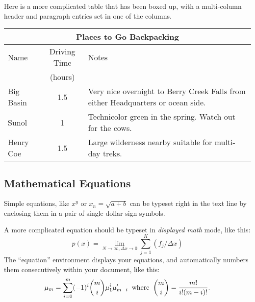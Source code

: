 \documentclass[11pt,oneside]{book}
\begin{document}
Here is a more complicated table that has been boxed up, with a multi-column
header and paragraph entries set in one of the columns.
\begin{center}
\begin{tabular}{|l|c|p{3.5in}|}
\hline
\multicolumn{3}{|c|}{Places to Go Backpacking}\\ \hline
Name&Driving Time&Notes\\
&(hours)&\\ \hline
Big Basin&1.5&Very nice overnight to Berry Creek Falls from
either Headquarters or ocean side.\\ \hline
Sunol&1&Technicolor green in the spring.  Watch out for the cows.\\ \hline
Henry Coe&1.5&Large wilderness nearby suitable for multi-day treks.\\ \hline
\end{tabular}
\end{center}

\subsection {Mathematical Equations}
Simple equations, like $x^y$ or $x_n = \sqrt{a + b}$ can be typeset right
in the text line by enclosing them in a pair of single dollar sign symbols.

A more complicated equation should be typeset in {\em displayed math\/} mode,
like this:
\[
p(x)=\lim_{N \rightarrow \infty, \Delta x \rightarrow 0}\sum_{j=1}^{K}(f_j/\Delta x)
\]
The ``equation'' environment displays your equations, and automatically
numbers them consecutively within your document, like this:
\begin{equation}
\mu_m=\sum_{i=0}^m(-1)^i{m \choose i}\mu_1^i\mu_{m-i}^{\prime} \; \; {\rm where} \; \; {m \choose i}={m! \over i!(m-i)!}.
\label{eq:summation1}
\end{equation}
\end{document}
